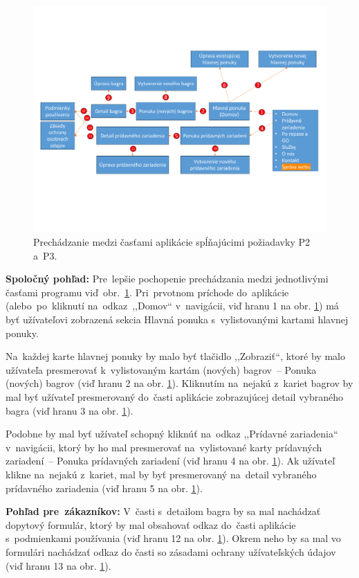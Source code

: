 \begin{figure}[H]\centering
\includegraphics[width=140mm]{../img/UI concept/p2 p3 graph}
\caption{Prechádzanie medzi časťami aplikácie spĺňajúcimi požiadavky P2 a~P3.}
\label{p2 p3 graph}
\end{figure}

\textbf{Spoločný pohľad:} Pre~lepšie pochopenie prechádzania medzi jednotlivými časťami programu viď~obr.~\ref{p2 p3 graph}. Pri~prvotnom príchode do~aplikácie (alebo~po~kliknutí na~odkaz~,,Domov`` v~navigácii, viď hranu 1 na obr. \ref{p2 p3 graph}) má byť užívateľovi zobrazená sekcia Hlavná ponuka s~vylistovanými kartami hlavnej ponuky.

Na~každej karte hlavnej ponuky by malo byť tlačidlo ,,Zobraziť``, ktoré by malo užívateľa presmerovať k~vylistovaným kartám (nových) bagrov~-- Ponuka (nových) bagrov (viď hranu 2 na obr. \ref{p2 p3 graph}). Kliknutím na~nejakú z~kariet bagrov by mal byť užívateľ presmerovaný do~časti aplikácie zobrazujúcej detail vybraného bagra (viď hranu 3 na obr. \ref{p2 p3 graph}).

Podobne by mal byť užívateľ schopný kliknúť na~odkaz ,,Prídavné zariadenia`` v~navigácii, ktorý by ho mal presmerovať na~vylistované karty prídavných zariadení~-- Ponuka prídavných zariadení (viď hranu 4 na obr. \ref{p2 p3 graph}). Ak užívateľ klikne na~nejakú z~kariet, mal by byť presmerovaný na~detail vybraného prídavného zariadenia (viď hranu 5 na obr. \ref{p2 p3 graph}).

\textbf{Pohľad pre~zákazníkov:} V~časti s~detailom bagra by sa mal nachádzať dopytový formulár, ktorý by mal obsahovať odkaz do~časti aplikácie s~podmienkami používania (viď hranu 12 na obr. \ref{p2 p3 graph}). Okrem neho by sa mal vo formulári nachádzať odkaz do časti so zásadami ochrany užívateľských údajov (viď hranu 13 na obr. \ref{p2 p3 graph}).

